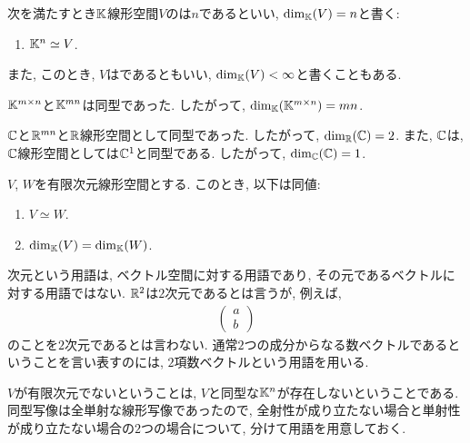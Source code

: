 \begin{definition}
次を満たすとき$\mathbb{K}$線形空間$V$のは$n$であるといい,
$\dim_{\mathbb{K}}(V)=n$と書く:
\begin{enumerate}
\item $\mathbb{K}^n\simeq V$.
\end{enumerate}
また,
このとき,
$V$はであるともいい, $\dim_{\mathbb{K}}(V)<\infty$と書くこともある.
\end{definition}

\begin{example}
$\mathbb{K}^{m\times n}$と$\mathbb{K}^{mn}$は同型であった.
したがって,
$\dim_{\mathbb{K}}(\mathbb{K}^{m\times n})=mn$.
\end{example}

\begin{example}
$\mathbb{C}$と$\mathbb{R}^{mn}$と$\mathbb{R}$線形空間として同型であった.
したがって,
$\dim_{\mathbb{R}}(\mathbb{C})=2$.
また,
$\mathbb{C}$は,
$\mathbb{C}$線形空間としては$\mathbb{C}^1$と同型である.
したがって,
$\dim_{\mathbb{C}}(\mathbb{C})=1$.
\end{example}

\begin{prop}
  $V$, $W$を有限次元線形空間とする.
  このとき, 以下は同値:
  \begin{enumerate}
  \item $V\simeq W$.
  \item $\dim_{\mathbb{K}}(V) = \dim_{\mathbb{K}}(W)$.
  \end{enumerate}
\end{prop}

\begin{remark}
次元という用語は,
ベクトル空間に対する用語であり, その元であるベクトルに対する用語ではない.
$\mathbb{R}^2$は$2$次元であるとは言うが,
例えば,
\begin{align*}
\begin{pmatrix}a\\b\end{pmatrix}
\end{align*}
のことを$2$次元であるとは言わない.
通常$2$つの成分からなる数ベクトルであるということを言い表すのには,
$2$項数ベクトルという用語を用いる.
\end{remark}


$V$が有限次元でないということは,
$V$と同型な$\mathbb{K}^n$が存在しないということである.
同型写像は全単射な線形写像であったので,
全射性が成り立たない場合と単射性が成り立たない場合の$2$つの場合について,
分けて用語を用意しておく.

